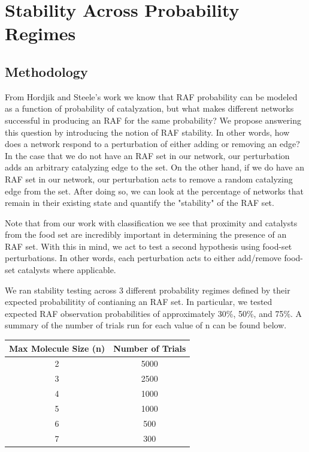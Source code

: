 \documentclass[11pt]{article}
\begin{document}
\section{Stability Across Probability Regimes}

\subsection{Methodology}

From Hordjik and Steele's work we know that RAF probability can be modeled as a function of probability of catalyzation, but what makes different networks successful in producing an RAF for the same probability? 
We propose answering this question by introducing the notion of RAF stability. In other words, how does a network respond to a perturbation of either adding or removing an edge?
In the case that we do not have an RAF set in our network, our perturbation adds an arbitrary catalyzing edge to the set. 
On the other hand, if we do have an RAF set in our network, our perturbation acts to remove a random catalyzing edge from the set. 
After doing so, we can look at the percentage of networks that remain in their existing state and quantify the "stability" of the RAF set. 

Note that from our work with classification we see that proximity and catalysts from the food set are incredibly important in determining the presence of an RAF set. 
With this in mind, we act to test a second hypothesis using food-set perturbations.
In other words, each perturbation acts to either add/remove food-set catalysts where applicable. 

We ran stability testing across 3 different probability regimes defined by their expected probabilitity of contianing an RAF set.
In particular, we tested expected RAF observation probabilities of approximately 30\%, 50\%, and 75\%. A summary of the number of trials run for each value of n can be found below.

\begin{table}[h!]
    \centering
     \begin{tabular}{||c| c||} 
     \hline
     Max Molecule Size (n) & Number of Trials \\ [0.5ex] 
     \hline\hline
     2 & 5000 \\ 
     3 & 2500 \\
     4 & 1000 \\
     5 & 1000 \\
     6 & 500 \\
     7 & 300 \\ [1ex] 
     \hline
    \end{tabular}
\end{table}
\end{document}
